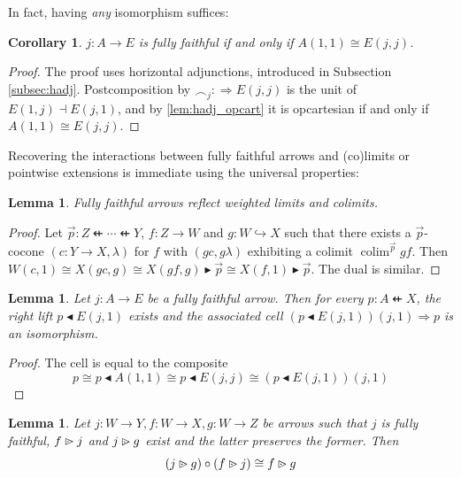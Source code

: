 \documentclass[10pt,a4paper]{article}
\newcommand{\To}{\Rightarrow}
\newcommand{\dfrom}{\nvleftarrow}
\newcommand{\plext}{\mathbin{{\rhd}\mathclap{\mspace{-17.5mu}\cdot}}}
\newcommand{\rext}{\mathbin{\blacktriangleright}}
\newcommand{\rift}{\mathbin{\blacktriangleleft}}
\newcommand{\simeqq}{\cong}
\DeclareMathOperator{\colim}{colim}
\theoremstyle{plain}
\newtheorem{corollary}[theorem]{Corollary}
\newtheorem{lemma}[theorem]{Lemma}
\theoremstyle{definition}
\theoremstyle{remark}
\begin{document}
In fact, having \textit{any} isomorphism suffices:

\begin{corollary}
    $j : A \to E$ is fully faithful if and only if $A(1, 1) \simeqq E(j, j)$.
\end{corollary}

\begin{proof}
    The proof uses horizontal adjunctions, introduced in Subsection \ref{subsec:hadj}. Postcomposition by $\smallfrown_j : \To E(j, j)$ is the unit of $E(1, j) \dashv E(j, 1)$, and by \ref{lem:hadj_opcart} it is opcartesian if and only if $A(1, 1) \simeqq E(j, j)$.
\end{proof}

Recovering the interactions between fully faithful arrows and (co)limits or pointwise extensions is immediate using the universal properties:

\begin{lemma}
    \label{lem:ff_refl_co_lim}
    Fully faithful arrows reflect weighted limits and colimits.
\end{lemma}

\begin{proof}
    Let $\vec p : Z \dfrom \cdots \dfrom Y$, $f : Z \to W$ and $g : W \hookrightarrow X$ such that there exists a $\vec p$-cocone $(c : Y \to X, \lambda)$ for $f$ with $(gc, g\lambda)$ exhibiting a colimit $\colim^{\vec p} gf$. Then $W(c, 1) \simeqq X(gc, g) \simeqq X(gf, g)\rext \vec p \simeqq X(f, 1) \rext \vec p$. The dual is similar.
\end{proof}

\begin{lemma}
    \label{lem:ff_res}
    Let $j : A \to E$ be a fully faithful arrow. Then for every $p : A \dfrom X$, the right lift $p \rift E(j, 1)$ exists and the associated cell $(p \rift E(j, 1))(j, 1) \To p$ is an isomorphism.
\end{lemma}

\begin{proof}
    The cell is equal to the composite
    $$p \simeqq p\rift A(1, 1) \simeqq p\rift E(j, j) \simeqq (p\rift E(j, 1))(j, 1)$$
\end{proof}

\begin{lemma}
    \label{lem:ff_lext_comp}
    Let $j : W \to Y, f : W \to X, g : W \to Z$ be arrows such that $j$ is fully faithful, $f\plext j$ and $j\plext g$ exist and the latter preserves the former. Then
    $$(j\plext g)\circ(f\plext j)\simeqq f\plext g$$
\end{lemma}
\end{document}
